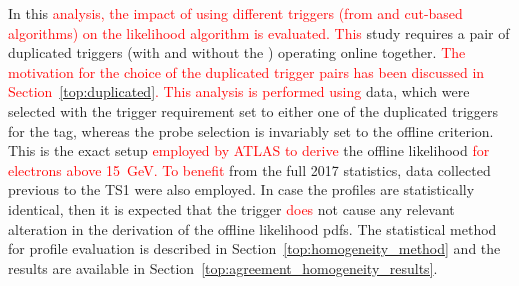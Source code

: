 In this 
\textcolor{red}{analysis, the impact of using different triggers (from \rnn{} and cut-based algorithms) on the likelihood algorithm is evaluated. This }
study requires a pair of duplicated triggers (with and without the \rnn{}) operating online together. 
\textcolor{red}{The motivation for the choice of the duplicated trigger pairs has been discussed in Section~\ref{top:duplicated}. This analysis is performed using} 
\Zee{} \tnp{} data, which were selected with the trigger requirement set to either one of the duplicated triggers for the tag, whereas the probe selection is invariably set to the offline \vloose{} criterion. This is the exact setup \textcolor{red}{employed by ATLAS to derive} the offline likelihood \textcolor{red}{for electrons above \SI{15}{\GeV}. To benefit} from the full 2017 statistics, data collected previous to the TS1 were also employed. In case the profiles are statistically identical, then it is expected that the \rnn{} trigger \textcolor{red}{does} not cause any relevant alteration in the derivation of the offline likelihood pdfs.  The statistical method for profile evaluation is described in Section~\ref{top:homogeneity_method} and the results are available in Section~\ref{top:agreement_homogeneity_results}.


